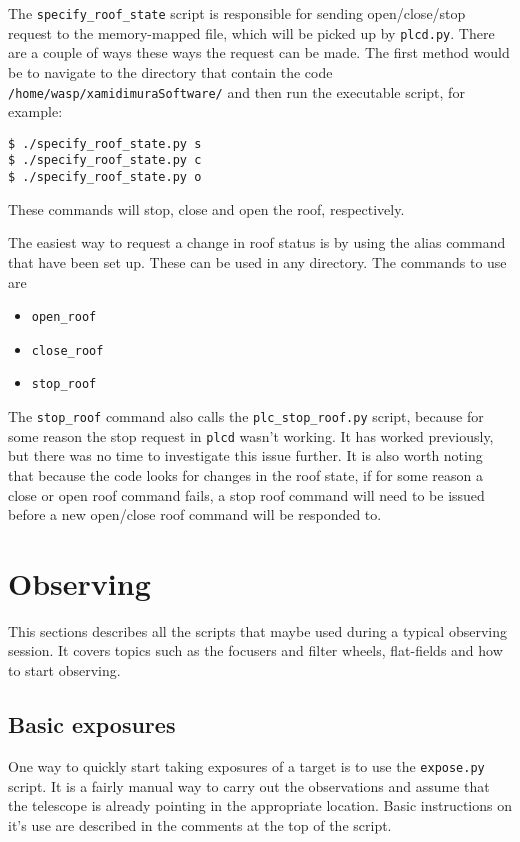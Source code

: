 \documentclass[a4paper,12pt]{article}
\begin{document}
The {\tt specify\_roof\_state} script is responsible for sending open/close/stop request to the memory-mapped file, which will be picked up by {\tt plcd.py}. There are a couple of ways these ways the request can be made. The first method would be to navigate to the directory that contain the code {\tt /home/wasp/xamidimuraSoftware/} and then run the executable script, for example:
\begin{verbatim}
$ ./specify_roof_state.py s
$ ./specify_roof_state.py c
$ ./specify_roof_state.py o
\end{verbatim}
These commands will stop, close and open the roof, respectively. 

The easiest way to request a change in roof status is by using the alias command that have been set up. These can be used in any directory. The commands to use are 
\begin{itemize}
\item{\tt open\_roof}
\item{\tt close\_roof}
\item{\tt stop\_roof}
\end{itemize}
{\color{blue} The {\tt stop\_roof} command also calls the {\tt plc\_stop\_roof.py} script, because for some reason the stop request in {\tt plcd} wasn't working. It has worked previously, but there was no time to investigate this issue further.} It is also worth noting that because the code looks for changes in the roof state, if for some reason a close or open roof command fails, a stop roof command will need to be issued before a new open/close roof command will be responded to. 

\section{Observing}

This sections describes all the scripts that maybe used during a typical observing session. It covers topics such as the focusers and filter wheels, flat-fields and how to start observing.

\subsection{Basic exposures}
\label{subsec:basicExp}

One way to quickly start taking exposures of a target is to use the {\tt expose.py} script. It is a fairly manual way to carry out the observations and assume that the telescope is already pointing in the appropriate location. Basic instructions on it's use are described in the comments at the top of the script.
\end{document}
